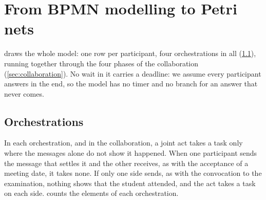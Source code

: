 \clearpage
\section{From BPMN modelling to Petri nets}
\label{sec:models}



 draws the whole model: one row per participant, four orchestrations in all (\cref{sec:orchestrations}), running together through the four phases of the collaboration (\cref{sec:collaboration}). No wait in it carries a deadline: we assume every participant answers in the end, so the model has no timer and no branch for an answer that never comes.

\subsection{Orchestrations}
\label{sec:orchestrations}

In each orchestration, and in the collaboration, a joint act takes a task only where the messages alone do not show it happened. When one participant sends the message that settles it and the other receives, as with the acceptance of a meeting date, it takes none. If only one side sends, as with the convocation to the examination, nothing shows that the student attended, and the act takes a task on each side.  counts the elements of each orchestration.


